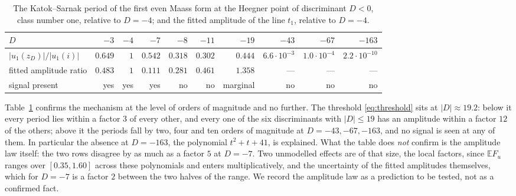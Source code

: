\documentclass[11pt,a4paper]{article}
\theoremstyle{remark}\newtheorem{remark}[theorem]{Remark}
\begin{document}
\begin{table}[htbp]
\centering\small
\caption{The Katok--Sarnak period of the first even Maass form at the Heegner point of discriminant $D<0$, class
number one, relative to $D=-4$; and the fitted amplitude of the line $t_1$, relative to $D=-4$.}\label{tab:periods}
\footnotesize\setlength{\tabcolsep}{4pt}
\begin{tabular}{lrrrrrrrrr}
\toprule
$D$ & $-3$ & $-4$ & $-7$ & $-8$ & $-11$ & $-19$ & $-43$ & $-67$ & $-163$\\
\midrule
$|u_1(z_D)|/|u_1(i)|$ & $0.649$ & $1$ & $0.542$ & $0.318$ & $0.302$ & $0.444$ & $6.6\cdot10^{-3}$ & $1.0\cdot10^{-4}$ & $2.2\cdot10^{-10}$\\
fitted amplitude ratio & $0.483$ & $1$ & $0.111$ & $0.281$ & $0.461$ & $1.358$ & --- & --- & ---\\
signal present & yes & yes & yes & no & no & marginal & no & no & no\\
\bottomrule
\end{tabular}
\end{table}

Table~\ref{tab:periods} confirms the mechanism at the level of orders of magnitude and no further. The threshold
\eqref{eq:threshold} sits at $|D|\approx19.2$: below it every period lies within a factor $3$ of every other, and
every one of the six discriminants with $|D|\le19$ has an amplitude within a factor $12$ of the others; above it the
periods fall by two, four and ten orders of magnitude at $D=-43,-67,-163$, and no signal is seen at any of them. In
particular the absence at $D=-163$, the polynomial $t^2+t+41$, is explained. What the table does \emph{not} confirm is
the amplitude law itself: the two rows disagree by as much as a factor $5$ at $D=-7$. Two unmodelled effects are of
that size, the local factors, since $\mathbb EF_u$ ranges over $[0.35,1.60]$ across these polynomials and enters
multiplicatively, and the uncertainty of the fitted amplitudes themselves, which for $D=-7$ is a factor $2$ between
the two halves of the range. We record the amplitude law as a prediction to be tested, not as a confirmed fact.
\end{document}
